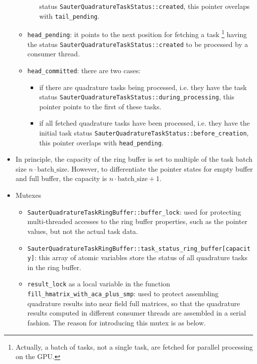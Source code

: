 \documentclass[11pt, a4paper]{book}
\begin{document}
\begin{itemize}
\begin{itemize}
\begin{itemize}
      status \texttt{SauterQuadratureTaskStatus::created}, this pointer overlaps with
      \texttt{tail\_pending}.
    \end{itemize}
  \item \texttt{head\_pending}: it points to the next position for fetching a task
    \footnote{Actually, a batch of tasks, not a single task, are fetched for parallel
      processing on the GPU.} having the status
    \texttt{SauterQuadratureTaskStatus::created} to be processed by a consumer thread.
  \item \texttt{head\_committed}: there are two cases:
    \begin{itemize}
    \item if there are quadrature tasks being processed, i.e. they have the task status
      \texttt{SauterQuadratureTaskStatus::during\_processing}, this pointer points to the
      first of these tasks.
    \item if all fetched quadrature tasks have been processed, i.e. they have the initial
      task status \texttt{SauterQuadratureTaskStatus::before\_creation}, this pointer
      overlaps with \texttt{head\_pending}.
    \end{itemize}
  \end{itemize}
\item In principle, the capacity of the ring buffer is set to multiple of the task batch
  size $n \cdot \text{batch\_size}$. However, to differentiate the pointer states for
  empty buffer and full buffer, the capacity is $n \cdot \text{batch\_size} + 1$.
\item Mutexes
  \begin{itemize}
  \item \texttt{SauterQuadratureTaskRingBuffer::buffer\_lock}: used for protecting
    multi-threaded accesses to the ring buffer properties, such as the pointer values, but
    not the actual task data.
  \item \texttt{SauterQuadratureTaskRingBuffer::task\_status\_ring\_buffer[capacity]}: this
    array of atomic variables store the status of all quadrature tasks in the ring buffer.
  \item \texttt{result\_lock} as a local variable in the function
    \texttt{fill\_hmatrix\_with\_aca\_plus\_smp}: used to protect assembling quadrature
    results into near field full matrices, so that the quadrature results computed in
    different consumer threads are assembled in a serial fashion. The reason for
    introducing this mutex is as below.


\end{itemize}
\end{itemize}
\end{document}
